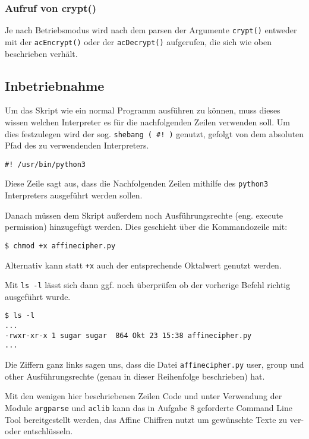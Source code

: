\documentclass[12pt]{article}
\begin{document}
\subsubsection{Aufruf von crypt()}
Je nach Betriebsmodus wird nach dem parsen der Argumente \texttt{crypt()} entweder mit der \texttt{acEncrypt()} oder der \texttt{acDecrypt()} aufgerufen, die sich wie oben beschrieben verhält.

\subsection{Inbetriebnahme}
Um das Skript wie ein normal Programm ausführen zu können, muss dieses wissen welchen Interpreter es für die nachfolgenden Zeilen verwenden soll. Um dies festzulegen wird der sog. \texttt{shebang ( \#! )} genutzt, gefolgt von dem absoluten Pfad des zu verwendenden Interpreters.

\begin{lstlisting}
#! /usr/bin/python3
\end{lstlisting}
Diese Zeile sagt aus, dass die Nachfolgenden Zeilen mithilfe des \texttt{python3} Interpreters ausgeführt werden sollen.

Danach müssen dem Skript außerdem noch Ausführungsrechte (eng. execute permission) hinzugefügt werden. Dies geschieht über die Kommandozeile mit:
\begin{lstlisting}
$ chmod +x affinecipher.py
\end{lstlisting}
Alternativ kann statt \texttt{+x} auch der entsprechende Oktalwert genutzt werden.

Mit \texttt{ls -l} lässt sich dann ggf. noch überprüfen ob der vorherige Befehl richtig ausgeführt wurde.
\begin{lstlisting}
$ ls -l
...
-rwxr-xr-x 1 sugar sugar  864 Okt 23 15:38 affinecipher.py
...
\end{lstlisting}
Die Ziffern ganz links sagen uns, dass die Datei \texttt{affinecipher.py} user, group und other Ausführungsrechte (genau in dieser Reihenfolge beschrieben) hat.

Mit den wenigen hier beschriebenen Zeilen Code und unter Verwendung der Module \texttt{argparse} und \texttt{aclib} kann das in Aufgabe 8 geforderte Command Line Tool bereitgestellt werden, das Affine Chiffren nutzt um gewünschte Texte zu ver- oder entschlüsseln.
\end{document}
